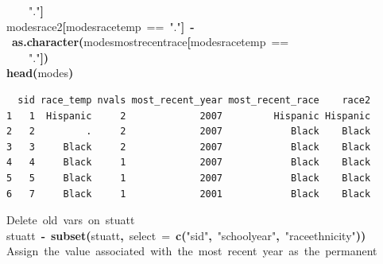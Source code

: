 \documentclass[12pt]{article}
\makeatletter
\newcommand{\hlfunctioncall}[1]{\textcolor[rgb]{0.501960784313725,0,0.329411764705882}{\textbf{#1}}}%
\newcommand{\hlstring}[1]{\textcolor[rgb]{0.6,0.6,1}{#1}}%
\newcommand{\hlkeyword}[1]{\textcolor[rgb]{0,0,0}{\textbf{#1}}}%
\newcommand{\hlargument}[1]{\textcolor[rgb]{0.690196078431373,0.250980392156863,0.0196078431372549}{#1}}%
\newcommand{\hlcomment}[1]{\textcolor[rgb]{0.180392156862745,0.6,0.341176470588235}{#1}}%
\newcommand{\hlassignement}[1]{\textcolor[rgb]{0,0,0}{\textbf{#1}}}%
\newcommand{\hlsymbol}[1]{\textcolor[rgb]{0,0,0}{#1}}%
\newcommand{\hlstd}[1]{\textcolor[rgb]{0,0,0}{#1}}%
\newenvironment{kframe}{%
 \def\FrameCommand##1{\hskip\@totalleftmargin \hskip-\fboxsep
 \colorbox{shadecolor}{##1}\hskip-\fboxsep
     \hskip-\linewidth \hskip-\@totalleftmargin \hskip\columnwidth}%
 \MakeFramed {\advance\hsize-\width
   \@totalleftmargin\z@ \linewidth\hsize
   \@setminipage}}%
 {\par\unskip\endMakeFramed}
\newenvironment{knitrout}{}{} %
\makeatother
\begin{document}
\begin{knitrout}
\begin{kframe}
\begin{flushleft}
\hlstd{}{\ }{\ }{\ }{\ }\hlstring{"{}."{}}\hlkeyword{]}\hspace*{\fill}\\
\hlstd{}\hlsymbol{modes}\hlkeyword{\usebox{\hlnormalsizeboxdollar}}\hlsymbol{race2}\hlkeyword{[}\hlsymbol{modes}\hlkeyword{\usebox{\hlnormalsizeboxdollar}}\hlsymbol{race\usebox{\hlnormalsizeboxunderscore}temp}{\ }=={\ }\hlstring{"{}."{}}\hlkeyword{]}{\ }\hlassignement{\usebox{\hlnormalsizeboxlessthan}-}{\ }\hlfunctioncall{as.character}\hlkeyword{(}\hlsymbol{modes}\hlkeyword{\usebox{\hlnormalsizeboxdollar}}\hlsymbol{most\usebox{\hlnormalsizeboxunderscore}recent\usebox{\hlnormalsizeboxunderscore}race}\hlkeyword{[}\hlsymbol{modes}\hlkeyword{\usebox{\hlnormalsizeboxdollar}}\hlsymbol{race\usebox{\hlnormalsizeboxunderscore}temp}{\ }==\hspace*{\fill}\\
\hlstd{}{\ }{\ }{\ }{\ }\hlstring{"{}."{}}\hlkeyword{]}\hlkeyword{)}\hspace*{\fill}\\
\hlstd{}\hlfunctioncall{head}\hlkeyword{(}\hlsymbol{modes}\hlkeyword{)}\mbox{}
\normalfont
\end{flushleft}
\begin{verbatim}
  sid race_temp nvals most_recent_year most_recent_race    race2
1   1  Hispanic     2             2007         Hispanic Hispanic
2   2         .     2             2007            Black    Black
3   3     Black     2             2007            Black    Black
4   4     Black     1             2007            Black    Black
5   5     Black     1             2007            Black    Black
6   7     Black     1             2001            Black    Black
\end{verbatim}
\begin{flushleft}
\ttfamily\noindent
\hlcomment{\usebox{\hlnormalsizeboxhash}{\ }Delete{\ }old{\ }vars{\ }on{\ }stuatt}\hspace*{\fill}\\
\hlstd{}\hlsymbol{stuatt}{\ }\hlassignement{\usebox{\hlnormalsizeboxlessthan}-}{\ }\hlfunctioncall{subset}\hlkeyword{(}\hlsymbol{stuatt}\hlkeyword{,}{\ }\hlargument{select}{\ }\hlargument{=}{\ }\hlfunctioncall{c}\hlkeyword{(}\hlstring{"{}sid"{}}\hlkeyword{,}{\ }\hlstring{"{}school\usebox{\hlnormalsizeboxunderscore}year"{}}\hlkeyword{,}{\ }\hlstring{"{}race\usebox{\hlnormalsizeboxunderscore}ethnicity"{}}\hlkeyword{)}\hlkeyword{)}\hspace*{\fill}\\
\hlstd{}\hlcomment{\usebox{\hlnormalsizeboxhash}{\ }Assign{\ }the{\ }value{\ }associated{\ }with{\ }the{\ }most{\ }recent{\ }year{\ }as{\ }the{\ }permanent}\hspace*{\fill}\\

\end{flushleft}
\end{kframe}
\end{knitrout}
\end{document}

